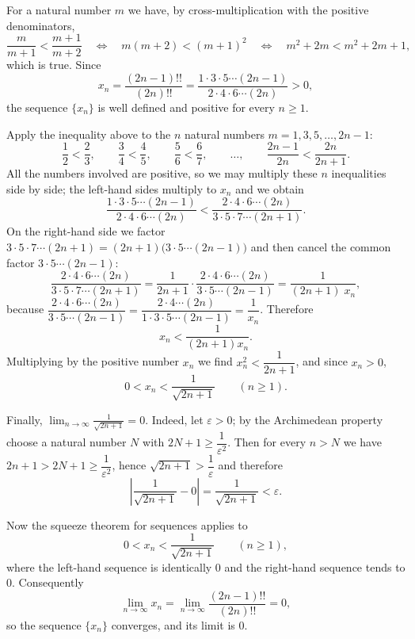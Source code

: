 \documentclass[11pt,a4paper]{article}
\newenvironment{solution}[1]{%
  \par\addvspace{1.7ex}%
  \noindent{\color{solutioncolor}\textbf{#1}}\hspace{0.55em}\ignorespaces}%
  {\par\addvspace{0.9ex}}
\begin{document}
\begin{solution}{Solution 2.1.14}\label{es:2.1.14}
For a natural number $m$ we have, by cross-multiplication with the positive denominators,
\[
\frac{m}{m+1}<\frac{m+1}{m+2}
\quad\Longleftrightarrow\quad
m(m+2)<(m+1)^{2}
\quad\Longleftrightarrow\quad
m^{2}+2m<m^{2}+2m+1 ,
\]
which is true. Since
\[
x_{n}=\frac{(2n-1)!!}{(2n)!!}
=\frac{1\cdot 3\cdot 5\cdots(2n-1)}{2\cdot 4\cdot 6\cdots(2n)}>0 ,
\]
the sequence $\{x_{n}\}$ is well defined and positive for every $n\ge 1$.

Apply the inequality above to the $n$ natural numbers $m=1,3,5,\dots,2n-1$:
\[
\frac{1}{2}<\frac{2}{3},\qquad
\frac{3}{4}<\frac{4}{5},\qquad
\frac{5}{6}<\frac{6}{7},\qquad\dots,\qquad
\frac{2n-1}{2n}<\frac{2n}{2n+1} .
\]
All the numbers involved are positive, so we may multiply these $n$ inequalities side by side; the left-hand sides multiply to $x_{n}$ and we obtain
\[
\frac{1\cdot 3\cdot 5\cdots(2n-1)}{2\cdot 4\cdot 6\cdots(2n)}
<\frac{2\cdot 4\cdot 6\cdots(2n)}{3\cdot 5\cdot 7\cdots(2n+1)} .
\]
On the right-hand side we factor $3\cdot 5\cdot 7\cdots(2n+1)=(2n+1)\bigl(3\cdot 5\cdots(2n-1)\bigr)$ and then cancel the common factor $3\cdot 5\cdots(2n-1)$:
\[
\frac{2\cdot 4\cdot 6\cdots(2n)}{3\cdot 5\cdot 7\cdots(2n+1)}
=\frac{1}{2n+1}\cdot\frac{2\cdot 4\cdot 6\cdots(2n)}{3\cdot 5\cdots(2n-1)}
=\frac{1}{(2n+1)\;x_{n}} ,
\]
because $\dfrac{2\cdot 4\cdot 6\cdots(2n)}{3\cdot 5\cdots(2n-1)}=\dfrac{2\cdot 4\cdots(2n)}{1\cdot 3\cdot 5\cdots(2n-1)}=\dfrac{1}{x_{n}}$. Therefore
\[
x_{n}<\frac{1}{(2n+1)x_{n}} .
\]
Multiplying by the positive number $x_{n}$ we find $x_{n}^{2}<\dfrac{1}{2n+1}$, and since $x_{n}>0$,
\[
0<x_{n}<\frac{1}{\sqrt{2n+1}}\qquad (n\ge 1).
\]

Finally, $\displaystyle\lim_{n\to\infty}\frac{1}{\sqrt{2n+1}}=0$. Indeed, let $\varepsilon>0$; by the Archimedean property choose a natural number $N$ with $2N+1\ge\dfrac{1}{\varepsilon^{2}}$. Then for every $n>N$ we have $2n+1>2N+1\ge\dfrac{1}{\varepsilon^{2}}$, hence $\sqrt{2n+1}>\dfrac{1}{\varepsilon}$ and therefore
\[
\left\lvert\frac{1}{\sqrt{2n+1}}-0\right\rvert=\frac{1}{\sqrt{2n+1}}<\varepsilon .
\]

Now the squeeze theorem for sequences applies to
\[
0<x_{n}<\frac{1}{\sqrt{2n+1}}\qquad (n\ge 1),
\]
where the left-hand sequence is identically $0$ and the right-hand sequence tends to $0$. Consequently
\[
\lim_{n\to\infty}x_{n}=\lim_{n\to\infty}\frac{(2n-1)!!}{(2n)!!}=0 ,
\]
so the sequence $\{x_{n}\}$ converges, and its limit is $0$.
\end{solution}
\end{document}
